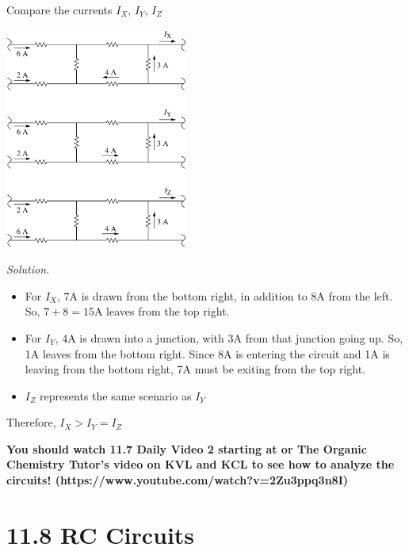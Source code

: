 \documentclass[12pt, titlepage]{article}
\begin{document}
\begin{Problem}
    Compare the currents $I_X$, $I_Y$, $I_Z$
    \begin{center}
        \includegraphics*[width=6cm]{media/junction1.png}  
    \end{center}

    \tcblower
    \textit{Solution. }
    \begin{itemize}
        \item For $I_X$, 7A is drawn from the bottom right, in addition to 8A from the left. So, $7+8=15$A leaves from the top right.
        \item For $I_Y$, 4A is drawn into a junction, with 3A from that junction going up. So, 1A leaves from the bottom right. Since 8A is entering the circuit and 1A is leaving from the bottom right, 7A must be exiting from the top right.
        \item $I_Z$ represents the same scenario as $I_Y$
    \end{itemize}
    Therefore, $I_X>I_Y=I_Z$
    
\end{Problem}

\textbf{You should watch 11.7 Daily Video 2 starting at or The Organic Chemistry Tutor's video on KVL and KCL to see how to analyze the circuits! (https://www.youtube.com/watch?v=2Zu3ppq3n8I)}

\section*{11.8 RC Circuits}
\end{document}
